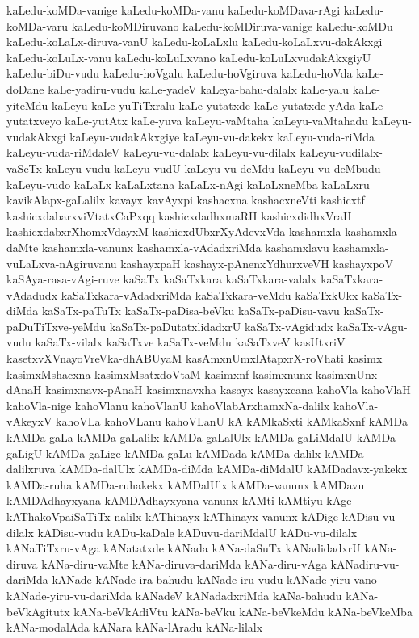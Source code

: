 {kaLedu-koMDa-vanige
kaLedu-koMDa-vanu
kaLedu-koMDava-rAgi
kaLedu-koMDa-varu
kaLedu-koMDiruvano
kaLedu-koMDiruva-vanige
kaLedu-koMDu
kaLedu-koLaLx-diruva-vanU
kaLedu-koLaLxlu
kaLedu-koLaLxvu-dakAkxgi
kaLedu-koLuLx-vanu
kaLedu-koLuLxvano
kaLedu-koLuLxvudakAkxgiyU
kaLedu-biDu-vudu
kaLedu-hoVgalu
kaLedu-hoVgiruva
kaLedu-hoVda
kaLe-doDane
kaLe-yadiru-vudu
kaLe-yadeV
kaLeya-bahu-dalalx
kaLe-yalu
kaLe-yiteMdu
kaLeyu
kaLe-yuTiTxralu
kaLe-yutatxde
kaLe-yutatxde-yAda
kaLe-yutatxveyo
kaLe-yutAtx
kaLe-yuva
kaLeyu-vaMtaha
kaLeyu-vaMtahadu
kaLeyu-vudakAkxgi
kaLeyu-vudakAkxgiye
kaLeyu-vu-dakekx
kaLeyu-vuda-riMda
kaLeyu-vuda-riMdaleV
kaLeyu-vu-dalalx
kaLeyu-vu-dilalx
kaLeyu-vudilalx-vaSeTx
kaLeyu-vudu
kaLeyu-vudU
kaLeyu-vu-deMdu
kaLeyu-vu-deMbudu
kaLeyu-vudo
kaLaLx
kaLaLxtana
kaLaLx-nAgi
kaLaLxneMba
kaLaLxru
kavikAlapx-gaLalilx
kavayx
kavAyxpi
kashacxna
kashacxneVti
kashicxtf
kashicxdabarxviVtatxCaPxqq
kashicxdadhxmaRH
kashicxdidhxVraH
kashicxdabxrXhomxVdayxM
kashicxdUbxrXyAdevxVda
kashamxla
kashamxla-daMte
kashamxla-vanunx
kashamxla-vAdadxriMda
kashamxlavu
kashamxla-vuLaLxva-nAgiruvanu
kashayxpaH
kashayx-pAnenxYdhurxveVH
kashayxpoV
kaSAya-rasa-vAgi-ruve
kaSaTx
kaSaTxkara
kaSaTxkara-valalx
kaSaTxkara-vAdadudx
kaSaTxkara-vAdadxriMda
kaSaTxkara-veMdu
kaSaTxkUkx
kaSaTx-diMda
kaSaTx-paTuTx
kaSaTx-paDisa-beVku
kaSaTx-paDisu-vavu
kaSaTx-paDuTiTxve-yeMdu
kaSaTx-paDutatxlidadxrU
kaSaTx-vAgidudx
kaSaTx-vAgu-vudu
kaSaTx-vilalx
kaSaTxve
kaSaTx-veMdu
kaSaTxveV
kasUtxriV
kasetxvXVnayoVreVka-dhABUyaM
kasAmxnUmxlAtapxrX-roVhati
kasimx
kasimxMshacxna
kasimxMsatxdoVtaM
kasimxnf
kasimxnunx
kasimxnUnx-dAnaH
kasimxnavx-pAnaH
kasimxnavxha
kasayx
kasayxcana
kahoVla
kahoVlaH
kahoVla-nige
kahoVlanu
kahoVlanU
kahoVlabArxhamxNa-dalilx
kahoVla-vAkeyxV
kahoVLa
kahoVLanu
kahoVLanU
kA
kAMkaSxti
kAMkaSxnf
kAMDa
kAMDa-gaLa
kAMDa-gaLalilx
kAMDa-gaLalUlx
kAMDa-gaLiMdalU
kAMDa-gaLigU
kAMDa-gaLige
kAMDa-gaLu
kAMDada
kAMDa-dalilx
kAMDa-dalilxruva
kAMDa-dalUlx
kAMDa-diMda
kAMDa-diMdalU
kAMDadavx-yakekx
kAMDa-ruha
kAMDa-ruhakekx
kAMDalUlx
kAMDa-vanunx
kAMDavu
kAMDAdhayxyana
kAMDAdhayxyana-vanunx
kAMti
kAMtiyu
kAge
kAThakoVpaiSaTiTx-nalilx
kAThinayx
kAThinayx-vanunx
kADige
kADisu-vu-dilalx
kADisu-vudu
kADu-kaDale
kADuvu-dariMdalU
kADu-vu-dilalx
kANaTiTxru-vAga
kANatatxde
kANada
kANa-daSuTx
kANadidadxrU
kANa-diruva
kANa-diru-vaMte
kANa-diruva-dariMda
kANa-diru-vAga
kANadiru-vu-dariMda
kANade
kANade-ira-bahudu
kANade-iru-vudu
kANade-yiru-vano
kANade-yiru-vu-dariMda
kANadeV
kANadadxriMda
kANa-bahudu
kANa-beVkAgitutx
kANa-beVkAdiVtu
kANa-beVku
kANa-beVkeMdu
kANa-beVkeMba
kANa-modalAda
kANara
kANa-lAradu
kANa-lilalx
}
